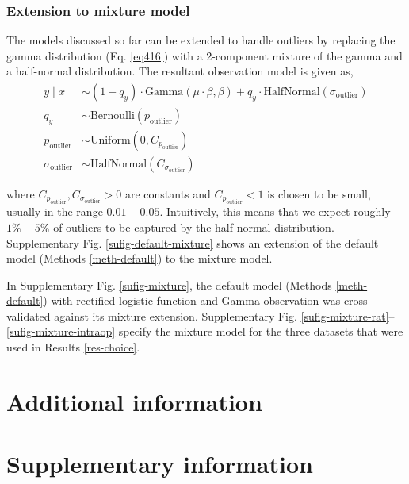 \documentclass[sn-mathphys-ay]{sn-jnl}%
\theoremstyle{thmstyleone}%
\theoremstyle{thmstyletwo}%
\theoremstyle{thmstylethree}%
\begin{document}
\subsubsection{Extension to mixture model}

The models discussed so far can be extended to handle outliers by replacing the gamma distribution (Eq. \ref{eq416}) with a 2-component mixture of the gamma and a half-normal distribution. The resultant observation model is given as,
\begin{align}
    y \mid x &\sim \left(1 - q_y\right)\cdot\text{Gamma}\left(\mu\cdot\beta, \beta\right) + q_y \cdot \text{HalfNormal}\left(\sigma_{\text{outlier}}\right) \label{eq425} \\
    q_y &\sim \text{Bernoulli}\left(p_{\text{outlier}}\right) \label{eq426} \\
    p_{\text{outlier}} &\sim \text{Uniform}\left(0, C_{p_{\text{outlier}}}\right) \label{eq427} \\
    \sigma_{\text{outlier}} &\sim \text{HalfNormal}\left(C_{\sigma_{\text{outlier}}}\right)\label{eq428}
\end{align}

where $C_{p_{\text{outlier}}}, C_{\sigma_{\text{outlier}}} > 0$ are constants and $C_{p_{\text{outlier}}} < 1$ is chosen to be small, usually in the range $0.01 - 0.05$. Intuitively, this means that we expect roughly $1\% - 5\%$ of outliers to be captured by the half-normal distribution. Supplementary Fig. \ref{sufig-default-mixture} shows an extension of the default model (Methods \ref{meth-default}) to the mixture model.

\bigskip\noindent In Supplementary Fig. \ref{sufig-mixture}, the default model (Methods \ref{meth-default}) with rectified-logistic function and Gamma observation was cross-validated against its mixture extension. Supplementary Fig. \ref{sufig-mixture-rat}--\ref{sufig-mixture-intraop} specify the mixture model for the three datasets that were used in Results \ref{res-choice}.


\section{Additional information}

\section{Supplementary information}
\end{document}
